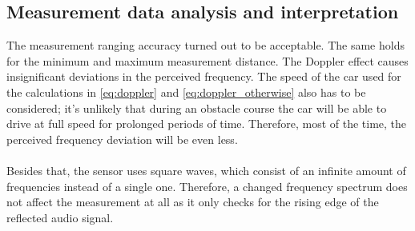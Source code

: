 \documentclass[final]{scrreprt} %
\begin{document}
\subsection{Measurement data analysis and interpretation}

The measurement ranging accuracy turned out to be acceptable. 
The same holds for the minimum and maximum measurement distance. 
The Doppler effect causes insignificant deviations in the perceived frequency. 
The speed of the car used for the calculations in \ref{eq:doppler} and \ref{eq:doppler_otherwise} also has to be considered; it's unlikely that during an obstacle course the car will be able to drive at full speed for prolonged periods of time.
Therefore, most of the time, the perceived frequency deviation will be even less.
\\ \\
Besides that, the sensor uses square waves, which consist of an infinite amount of frequencies instead of a single one.
Therefore, a changed frequency spectrum does not affect the measurement at all as it only checks for the rising edge of the reflected audio signal.
\end{document}
